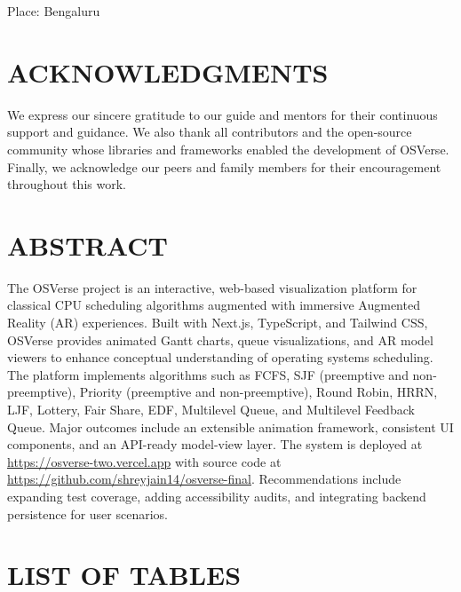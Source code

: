 \documentclass[12pt,a4paper,oneside]{report}
\newcommand{\projectShort}{OSVerse}
\newcommand{\githubURL}{https://github.com/shreyjain14/osverse-final}
\newcommand{\projectURL}{https://osverse-two.vercel.app}
\begin{document}
\vfill
\noindent Place: Bengaluru

\clearpage
{}
\setcounter{page}{3} %
\chapter*{\MakeUppercase{Acknowledgments}}
We express our sincere gratitude to our guide and mentors for their continuous support and guidance. We also thank all contributors and the open-source community whose libraries and frameworks enabled the development of \projectShort{}. Finally, we acknowledge our peers and family members for their encouragement throughout this work.

\clearpage
\chapter*{\MakeUppercase{Abstract}}
The OSVerse project is an interactive, web-based visualization platform for classical CPU scheduling algorithms augmented with immersive Augmented Reality (AR) experiences. Built with Next.js, TypeScript, and Tailwind CSS, OSVerse provides animated Gantt charts, queue visualizations, and AR model viewers to enhance conceptual understanding of operating systems scheduling. The platform implements algorithms such as FCFS, SJF (preemptive and non-preemptive), Priority (preemptive and non-preemptive), Round Robin, HRRN, LJF, Lottery, Fair Share, EDF, Multilevel Queue, and Multilevel Feedback Queue. Major outcomes include an extensible animation framework, consistent UI components, and an API-ready model-view layer. The system is deployed at \href{\projectURL}{\projectURL} with source code at \href{\githubURL}{\githubURL}. Recommendations include expanding test coverage, adding accessibility audits, and integrating backend persistence for user scenarios.

\clearpage
\thispagestyle{nohf}
{\hypersetup{linkcolor=black}\tableofcontents}
\clearpage

\chapter*{\MakeUppercase{List of Tables}}
\thispagestyle{fancy}
\listoftables
\end{document}
